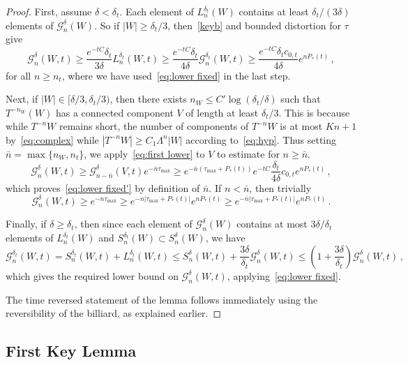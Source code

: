\documentclass[10pt]{amsart}
\theoremstyle{definition}\newtheorem{defi}[theo]{Definition}\newtheorem{rema}[theo]{Remark}\newtheorem{exam}[theo]{Example}\newtheorem{exem}[theo]{Example}\newtheorem{nota}[theo]{Notation}
\newcommand{\cG}{\mathcal{G}}
\begin{document}
\begin{proof}
First, assume $\delta < \delta_t$. Each element of $L_n^{\delta_t}(W)$ contains at least $\delta_t/(3 \delta)$ elements of $\cG_n^\delta(W)$. So if $|W| \ge \delta_t/3$, then~\eqref{keyb} and bounded distortion for $\tau$ give
\begin{equation}\label{eq:first lower}
\cG_n^\delta(W,t) \ge \frac{e^{- tC}\delta_t}{3 \delta} L_n^{\delta_t}(W,t)
\ge \frac{e^{- tC}\delta_t}{4 \delta} \cG_n^{\delta_t}(W,t)
\ge \frac{e^{- tC} \delta_t c_{0,t}}{4 \delta} e^{n P_*(t)} \,,
\end{equation}
for all $n\ge n_t$, where we have used~\eqref{eq:lower fixed} in the last step.

Next, if $|W| \in [\delta/3, \delta_t/3)$, then there exists $n_W \le C' \log(\delta_t/\delta)$ such that $T^{-n_W}(W)$ has a connected component $V$ of length at least $\delta_t/3$. This is because while $T^{-n}W$ remains short, the number of components of $T^{-n}W$ is at most $Kn+1$ by~\eqref{eq:complex} while $|T^{-n}W| \ge C_1 \Lambda^n |W|$ according to~\eqref{eq:hyp}. Thus setting $\bar n = \max 
\{ n_W, n_t \}$, we apply~\eqref{eq:first lower} to $V$ to estimate for $n \ge \bar n$.
\[
\cG_n^\delta(W,t) \ge \cG^\delta_{n - \bar n}(V, t) e^{- \bar n \tau_{\max}}
\ge e^{- \bar n (\tau_{\max} + P_*(t))} e^{- tC} \frac{\delta_t}{4 \delta} c_{0,t} e^{n P_*(t)} \,,
\]
which proves~\eqref{eq:lower fixed'} by definition of $\bar n$. If $n < \bar n$, then trivially
\[
\cG_n^\delta(W,t) \ge e^{- n \tau_{\max}}
\ge e^{- n \left|\tau_{\max} + P_*(t)\right|} e^{n P_*(t)}
\ge e^{- \bar n\left|\tau_{\max} + P_*(t)\right|} e^{n P_*(t)} \,.
\]

Finally, if $\delta \ge \delta_t$, then since each element of $\cG^{\delta}_n(W)$ contains at most $3\delta/\delta_t$ elements of $L^{\delta_t}_n(W)$ and $S^{\delta_t}_n(W) \subset S^\delta_n(W)$, we have
\[
\cG_n^{\delta_t}(W,t) = S^{\delta_t}_n(W,t) + L^{\delta_t}_n(W,t)
\le S^{\delta}_n(W,t) + \frac{3 \delta}{\delta_t} \cG^{\delta}_n(W,t)
\le \left(1 + \frac{3 \delta}{\delta_t} \right) \cG^{\delta}_n(W,t) \,,
\]
which gives the required lower bound on $\cG^\delta_n(W,t)$, applying~\eqref{eq:lower fixed}.

The time reversed statement of the lemma follows immediately using the reversibility of the billiard, as explained earlier.
\end{proof}



\subsection{First Key Lemma}\label{KL}
\end{document}
